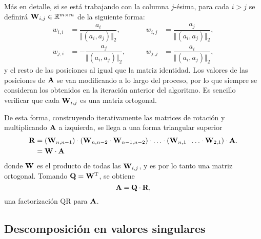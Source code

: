 Más en detalle, si se está trabajando con la columna $j$-ésima, para cada
$i>j$ se definirá $\mathbf{W}_{i,j} \in \mathbb{R}^{m \times m}$
de la siguiente forma:
\[ \begin{aligned}
    w_{i,i} &= \dfrac{a_i}{\Vert (a_{i}, a_{j}) \Vert_2}, \qquad&
    w_{i,j} &= \dfrac{a_j}{\Vert (a_{i}, a_{j}) \Vert_2}, \\
    w_{j,i} &= - \dfrac{a_j}{\Vert (a_{i}, a_{j}) \Vert_2}, \qquad&
    w_{j,j} &= \dfrac{a_i}{\Vert (a_{i}, a_{j}) \Vert_2},
\end{aligned} \]
y el resto de las posiciones al igual que la matriz identidad. Los valores de
las posiciones de $\mathbf{A}$ se van modificando a lo largo del proceso, por lo
que siempre se consideran los obtenidos en la iteración anterior del
algoritmo. Es sencillo verificar que cada $\mathbf{W}_{i,j}$ es una
matriz ortogonal.

De esta forma, construyendo iterativamente las matrices de rotación y
multiplicando $\mathbf{A}$ a izquierda, se llega a una forma triangular superior
\[ \begin{aligned}
    \mathbf{R} &= (\mathbf{W}_{n,n-1})
        \cdot (\mathbf{W}_{n,n-2} \cdot \mathbf{W}_{n-1,n-2})
        \cdot \ldots
        \cdot (\mathbf{W}_{n,1} \cdot \ldots \cdot \mathbf{W}_{2,1}) \cdot \mathbf{A}. \\
    &= \mathbf{W} \cdot \mathbf{A}
\end{aligned} \]
donde $\mathbf{W}$ es el producto de todas las $\mathbf{W}_{i,j}$, y es por lo tanto
una matriz ortogonal. Tomando $\mathbf{Q} = \mathbf{W}^{\mathrm{T}}$, se obtiene
\[ \mathbf{A} = \mathbf{Q} \cdot \mathbf{R}, \]
una factorización QR para $\mathbf{A}$.

\subsection{Descomposición en valores singulares}



